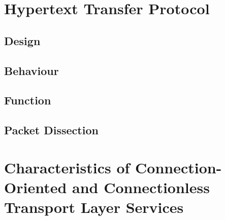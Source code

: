 \documentclass[10pt]{report}
\begin{document}

\chapter{Hypertext Transfer Protocol}

\section{Design}
\section{Behaviour}
\section{Function}
\section{Packet Dissection}



\chapter{Characteristics of Connection-Oriented and Connectionless Transport
	Layer Services}



%
%


\end{document}
